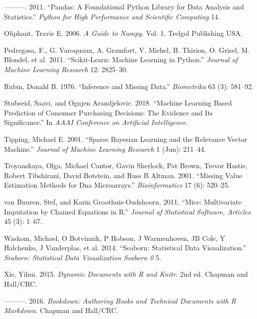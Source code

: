 \documentclass[
  11pt,
  a4paper,
  DIV=12,captions=tableheading,oneside,titlepage]{scrbook}
\begin{document}
\leavevmode\hypertarget{ref-mckinney2011pandas}{}%
---------. 2011. ``Pandas: A Foundational Python Library for Data Analysis and Statistics.'' \emph{Python for High Performance and Scientific Computing} 14.

\leavevmode\hypertarget{ref-oliphant2006guide}{}%
Oliphant, Travis E. 2006. \emph{A Guide to Numpy}. Vol. 1. Trelgol Publishing USA.

\leavevmode\hypertarget{ref-scikit-learn}{}%
Pedregosa, F., G. Varoquaux, A. Gramfort, V. Michel, B. Thirion, O. Grisel, M. Blondel, et al. 2011. ``Scikit-Learn: Machine Learning in Python.'' \emph{Journal of Machine Learning Research} 12: 2825--30.

\leavevmode\hypertarget{ref-rubin1976inference}{}%
Rubin, Donald B. 1976. ``Inference and Missing Data.'' \emph{Biometrika} 63 (3): 581--92.

\leavevmode\hypertarget{ref-stubseid2018}{}%
Stubseid, Saavi, and Ognjen Arandjelovic. 2018. ``Machine Learning Based Prediction of Consumer Purchasing Decisions: The Evidence and Its Significance.'' In \emph{AAAI Conference on Artificial Intelligence}.

\leavevmode\hypertarget{ref-tipping2001sparse}{}%
Tipping, Michael E. 2001. ``Sparse Bayesian Learning and the Relevance Vector Machine.'' \emph{Journal of Machine Learning Research} 1 (Jun): 211--44.

\leavevmode\hypertarget{ref-troyanskaya2001missing}{}%
Troyanskaya, Olga, Michael Cantor, Gavin Sherlock, Pat Brown, Trevor Hastie, Robert Tibshirani, David Botstein, and Russ B Altman. 2001. ``Missing Value Estimation Methods for Dna Microarrays.'' \emph{Bioinformatics} 17 (6): 520--25.

\leavevmode\hypertarget{ref-buuren2011mice}{}%
van Buuren, Stef, and Karin Groothuis-Oudshoorn. 2011. ``Mice: Multivariate Imputation by Chained Equations in R.'' \emph{Journal of Statistical Software, Articles} 45 (3): 1--67.

\leavevmode\hypertarget{ref-waskom2014seaborn}{}%
Waskom, Michael, O Botvinnik, P Hobson, J Warmenhoven, JB Cole, Y Halchenko, J Vanderplas, et al. 2014. ``Seaborn: Statistical Data Visualization.'' \emph{Seaborn: Statistical Data Visualization Seaborn 0} 5.

\leavevmode\hypertarget{ref-xie2015}{}%
Xie, Yihui. 2015. \emph{Dynamic Documents with R and Knitr}. 2nd ed. Chapman and Hall/CRC.

\leavevmode\hypertarget{ref-xie2016bookdown}{}%
---------. 2016. \emph{Bookdown: Authoring Books and Technical Documents with R Markdown}. Chapman and Hall/CRC.
\end{document}
